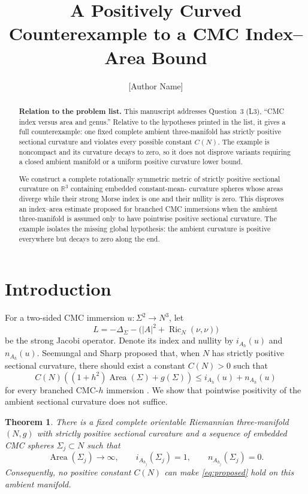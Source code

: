 \documentclass[11pt]{article}
\title{A Positively Curved Counterexample to a CMC Index--Area Bound}
\author{[Author Name]}
\date{}
\newtheorem{theorem}{Theorem}
\theoremstyle{remark}
\newcommand{\Area}{\operatorname{Area}}
\newcommand{\Ric}{\operatorname{Ric}}
\begin{document}
\maketitle

\begin{abstract}
\textbf{Relation to the problem list.}
This manuscript addresses Question~3 (L3), ``CMC index versus area and
genus.''  Relative to the hypotheses printed in the list, it gives a full
counterexample: one fixed complete ambient three-manifold has strictly
positive sectional curvature and violates every possible constant $C(N)$.
The example is noncompact and its curvature decays to zero, so it does not
disprove variants requiring a closed ambient manifold or a uniform positive
curvature lower bound.

We construct a complete rotationally symmetric metric of strictly positive
sectional curvature on $\mathbb R^3$ containing embedded constant-mean-
curvature spheres whose areas diverge while their strong Morse index is one
and their nullity is zero.  This disproves an index--area estimate proposed
for branched CMC immersions when the ambient three-manifold is assumed only
to have pointwise positive sectional curvature.  The example isolates the
missing global hypothesis: the ambient curvature is positive everywhere but
decays to zero along the end.
\end{abstract}

\section{Introduction}

For a two-sided CMC immersion $u\colon\Sigma^2\to N^3$, let
\[
 L=-\Delta_\Sigma-\bigl(|A|^2+\Ric_N(\nu,\nu)\bigr)
\]
be the strong Jacobi operator.  Denote its index and nullity by
$i_{A_h}(u)$ and $n_{A_h}(u)$.  Seemungal and Sharp proposed that, when
$N$ has strictly positive sectional curvature, there should exist a
constant $C(N)>0$ such that
\begin{equation}\label{eq:proposed}
 C(N)\left((1+h^2)\Area(\Sigma)+g(\Sigma)\right)
 \le i_{A_h}(u)+n_{A_h}(u)
\end{equation}
for every branched CMC-$h$ immersion \cite{SeemungalSharp}.  We show that
pointwise positivity of the ambient sectional curvature does not suffice.

\begin{theorem}\label{thm:main}
There is a fixed complete orientable Riemannian three-manifold $(N,g)$ with
strictly positive sectional curvature and a sequence of embedded CMC
spheres $\Sigma_j\subset N$ such that
\[
 \Area(\Sigma_j)\longrightarrow\infty,
 \qquad
 i_{A_{h_j}}(\Sigma_j)=1,
 \qquad
 n_{A_{h_j}}(\Sigma_j)=0.
\]
Consequently, no positive constant $C(N)$ can make
\eqref{eq:proposed} hold on this ambient manifold.
\end{theorem}
\end{document}

